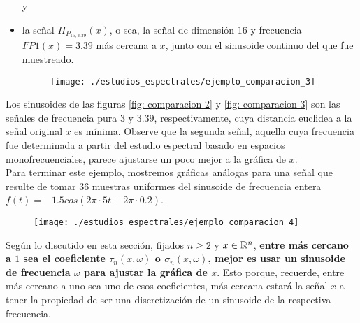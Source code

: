 \begin{ejemplo}
\begin{itemize}
	y
	\item la señal $\Pi_{P_{16, 3.39}}(x)$, o sea, la señal de
	dimensión $16$ y frecuencia $FP1(x)=3.39$ más cercana a $x$, junto con
	el sinusoide continuo del que fue muestreado.
	\begin{figure}[H]
			\centering
			\texttt{[image: ./estudios\_espectrales/ejemplo\_comparacion\_3]} 
		\end{figure}		
\end{itemize}


Los sinusoides de las figuras \ref{fig: comparacion 2} y
\ref{fig: comparacion 3}
son las señales de frecuencia pura
$3$ y $3.39$, respectivamente, cuya distancia euclidea
a la señal original $x$ es mínima. Observe que la segunda
señal, aquella cuya frecuencia
fue determinada
a partir del estudio espectral basado en espacios
monofrecuenciales,
parece ajustarse un poco mejor a la gráfica de $x$. \\

Para terminar este ejemplo, mostremos gráficas análogas
para una señal que resulte de tomar $36$
muestras uniformes del sinusoide de frecuencia entera
$f(t) = -1.5cos(2 \pi \cdot 5 t + 2\pi \cdot 0.2)$.
	\begin{figure}[H]
			\centering
			\texttt{[image: ./estudios\_espectrales/ejemplo\_comparacion\_4]} 
		\end{figure}	

\final
\end{ejemplo}

\begin{nota}
Según lo discutido en esta sección, fijados $n \geq 2$
y $x \in \mathbb{R}^{n}$, \textbf{entre más cercano a $1$ sea 
el coeficiente $\tau_{n}(x, \omega)$ o 
$\sigma_{n}(x, \omega)$, mejor es usar un sinusoide
de frecuencia $\omega$ para ajustar la gráfica de $x$}.
Esto porque, recuerde, entre más cercano a uno sea uno de
esos coeficientes, más cercana estará la señal $x$ a tener
la propiedad de ser una discretización de un sinusoide
de la respectiva frecuencia.
\end{nota}
